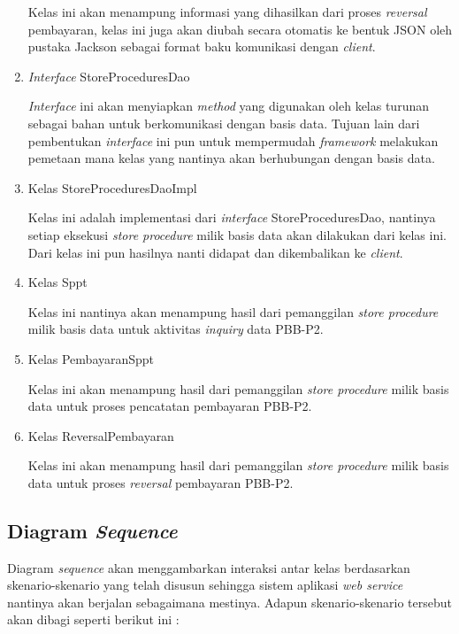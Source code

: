 \documentclass[pdftex,12pt, oneside]{article}
\begin{document}
\begin{enumerate}[1.]
  Kelas ini akan menampung informasi yang dihasilkan dari proses \textit{reversal} pembayaran, kelas ini juga akan diubah secara otomatis ke bentuk JSON oleh pustaka Jackson sebagai format baku komunikasi dengan \textit{client}.
  
  \item \textit{Interface} StoreProceduresDao
  
  \textit{Interface} ini akan menyiapkan \textit{method} yang digunakan oleh kelas turunan sebagai bahan untuk berkomunikasi dengan basis data. Tujuan lain dari pembentukan \textit{interface} ini pun untuk mempermudah \textit{framework} melakukan pemetaan mana kelas yang nantinya akan berhubungan dengan basis data.
  
  \item Kelas StoreProceduresDaoImpl
  
  Kelas ini adalah implementasi dari \textit{interface} StoreProceduresDao, nantinya setiap eksekusi \textit{store procedure} milik basis data akan dilakukan dari kelas ini. Dari kelas ini pun hasilnya nanti didapat dan dikembalikan ke \textit{client}.
  
  \item Kelas Sppt
  
  Kelas ini nantinya akan menampung hasil dari pemanggilan \textit{store procedure} milik basis data untuk aktivitas \textit{inquiry} data PBB-P2.
  
  \item Kelas PembayaranSppt
  
  Kelas ini akan menampung hasil dari pemanggilan \textit{store procedure} milik basis data untuk proses pencatatan pembayaran PBB-P2.
  
  \item Kelas ReversalPembayaran
  
  Kelas ini akan menampung hasil dari pemanggilan \textit{store procedure} milik basis data untuk proses \textit{reversal} pembayaran PBB-P2.
  
\end{enumerate}

\subsection{Diagram \textit{Sequence}}

Diagram \textit{sequence} akan menggambarkan interaksi antar kelas berdasarkan skenario-skenario yang telah disusun sehingga sistem aplikasi \textit{web service} nantinya akan berjalan sebagaimana mestinya. Adapun skenario-skenario tersebut akan dibagi seperti berikut ini :
\end{document}
